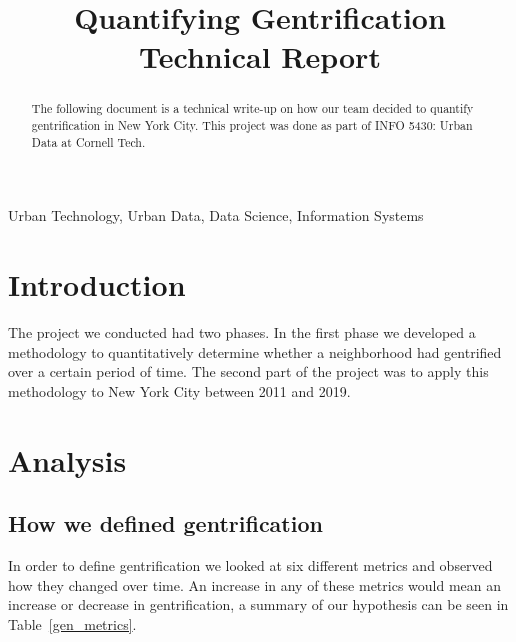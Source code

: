 \documentclass[conference]{IEEEtran}
\begin{document}
\title{Quantifying Gentrification Technical Report}

\author{
\and
{}
\and
{}
}

\maketitle

\begin{abstract}
The following document is a technical write-up on how our team decided to quantify gentrification in New York City. This project was done as part of INFO 5430: Urban Data at Cornell Tech. 
\end{abstract}

\begin{IEEEkeywords}
Urban Technology, Urban Data, Data Science, Information Systems
\end{IEEEkeywords}

\section{Introduction}
The project we conducted had two phases. In the first phase we developed a methodology to quantitatively determine whether a neighborhood had gentrified over a certain period of time. The second part of the project was to apply this methodology to New York City between 2011 and 2019.

\section{Analysis}

\subsection{How we defined gentrification}
In order to define gentrification we looked at six different metrics and observed how they changed over time. An increase in any of these metrics would mean an increase or decrease in gentrification, a summary of our hypothesis can be seen in Table~\ref{gen_metrics}.
\end{document}
